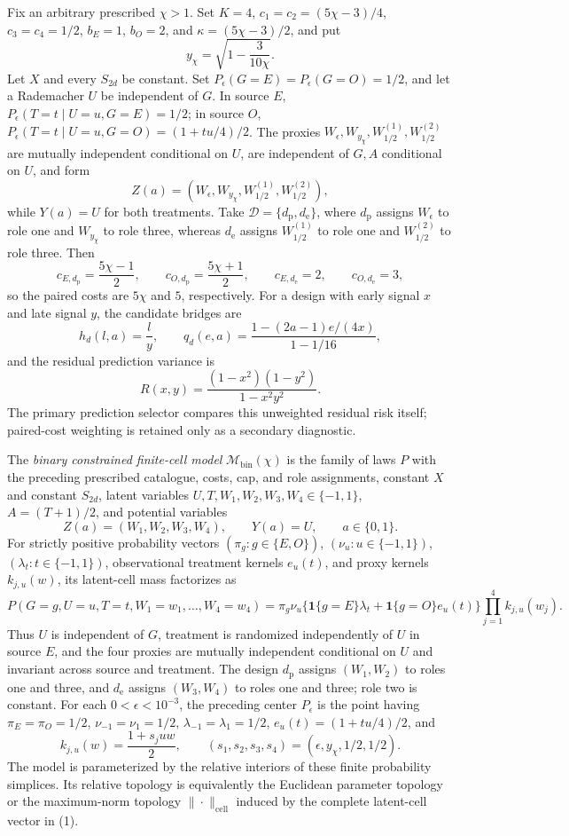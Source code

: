 Fix an arbitrary prescribed \(\chi>1\). Set \(K=4\), \(c_1=c_2=(5\chi-3)/4\), \(c_3=c_4=1/2\), \(b_E=1\), \(b_O=2\), and \(\kappa=(5\chi-3)/2\), and put
\[
 y_{\chi}=\sqrt{1-\frac{3}{10\chi}}.
\]
Let \(X\) and every \(S_{2d}\) be constant. Set \(P_{\epsilon}(G=E)=P_{\epsilon}(G=O)=1/2\), and let a Rademacher \(U\) be independent of \(G\). In source \(E\), \(P_{\epsilon}(T=t\mid U=u,G=E)=1/2\); in source \(O\), \(P_{\epsilon}(T=t\mid U=u,G=O)=(1+tu/4)/2\). The proxies \(W_{\epsilon},W_{y_{\chi}},W_{1/2}^{(1)},W_{1/2}^{(2)}\) are mutually independent conditional on \(U\), are independent of \(G,A\) conditional on \(U\), and form
\[
 Z(a)=(W_{\epsilon},W_{y_{\chi}},W_{1/2}^{(1)},W_{1/2}^{(2)}),
\]
while \(Y(a)=U\) for both treatments. Take \(\mathcal D=\{d_{\mathrm p},d_{\mathrm e}\}\), where \(d_{\mathrm p}\) assigns \(W_{\epsilon}\) to role one and \(W_{y_{\chi}}\) to role three, whereas \(d_{\mathrm e}\) assigns \(W_{1/2}^{(1)}\) to role one and \(W_{1/2}^{(2)}\) to role three. Then
\[
 c_{E,d_{\mathrm p}}=\frac{5\chi-1}{2},\qquad
 c_{O,d_{\mathrm p}}=\frac{5\chi+1}{2},\qquad
 c_{E,d_{\mathrm e}}=2,\qquad c_{O,d_{\mathrm e}}=3,
\]
so the paired costs are \(5\chi\) and \(5\), respectively. For a design with early signal \(x\) and late signal \(y\), the candidate bridges are
\[
 h_d(l,a)=\frac{l}{y},
 \qquad
 q_d(e,a)=\frac{1-(2a-1)e/(4x)}{1-1/16},
\]
and the residual prediction variance is
\[
 R(x,y)=\frac{(1-x^2)(1-y^2)}{1-x^2y^2}.
\]
The primary prediction selector compares this unweighted residual risk itself; paired-cost weighting is retained only as a secondary diagnostic.

The \emph{binary constrained finite-cell model} \(\mathcal M_{\mathrm{bin}}(\chi)\) is the family of laws \(P\) with the preceding prescribed catalogue, costs, cap, and role assignments, constant \(X\) and constant \(S_{2d}\), latent variables \(U,T,W_1,W_2,W_3,W_4\in\{-1,1\}\), \(A=(T+1)/2\), and potential variables
\[
 Z(a)=(W_1,W_2,W_3,W_4),\qquad Y(a)=U,
 \qquad a\in\{0,1\}.
\]
For strictly positive probability vectors \((\pi_g:g\in\{E,O\})\), \((\nu_u:u\in\{-1,1\})\), \((\lambda_t:t\in\{-1,1\})\), observational treatment kernels \(e_u(t)\), and proxy kernels \(k_{j,u}(w)\), its latent-cell mass factorizes as
\[
 P(G=g,U=u,T=t,W_1=w_1,\ldots,W_4=w_4)
 =\pi_g\nu_u\bigl\{\mathbf 1\{g=E\}\lambda_t
 +\mathbf 1\{g=O\}e_u(t)\bigr\}
 \prod_{j=1}^4k_{j,u}(w_j). \tag{1}
\]
Thus \(U\) is independent of \(G\), treatment is randomized independently of \(U\) in source \(E\), and the four proxies are mutually independent conditional on \(U\) and invariant across source and treatment. The design \(d_{\mathrm p}\) assigns \((W_1,W_2)\) to roles one and three, and \(d_{\mathrm e}\) assigns \((W_3,W_4)\) to roles one and three; role two is constant. For each \(0<\epsilon<10^{-3}\), the preceding center \(P_\epsilon\) is the point having \(\pi_E=\pi_O=1/2\), \(\nu_{-1}=\nu_1=1/2\), \(\lambda_{-1}=\lambda_1=1/2\), \(e_u(t)=(1+tu/4)/2\), and
\[
 k_{j,u}(w)=\frac{1+s_juw}{2},
 \qquad
 (s_1,s_2,s_3,s_4)=(\epsilon,y_{\chi},1/2,1/2).
\]
The model is parameterized by the relative interiors of these finite probability simplices. Its relative topology is equivalently the Euclidean parameter topology or the maximum-norm topology \(\|\cdot\|_{\mathrm{cell}}\) induced by the complete latent-cell vector in (1).